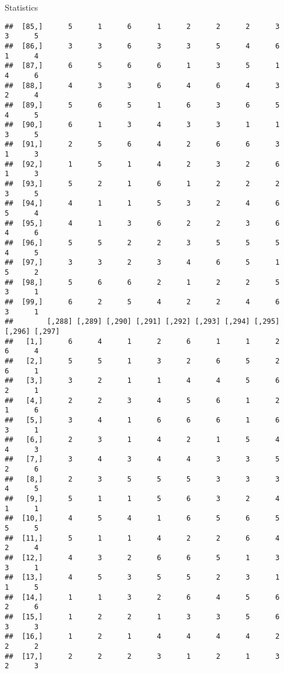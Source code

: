\documentclass[
  ignorenonframetext,
]{beamer}
\begin{document}
\begin{frame}[fragile]{Statistics}
\begin{verbatim}
##  [85,]      5      1      6      1      2      2      2      3      3      5
##  [86,]      3      3      6      3      3      5      4      6      1      4
##  [87,]      6      5      6      6      1      3      5      1      4      6
##  [88,]      4      3      3      6      4      6      4      3      2      4
##  [89,]      5      6      5      1      6      3      6      5      4      5
##  [90,]      6      1      3      4      3      3      1      1      3      5
##  [91,]      2      5      6      4      2      6      6      3      1      3
##  [92,]      1      5      1      4      2      3      2      6      1      3
##  [93,]      5      2      1      6      1      2      2      2      3      5
##  [94,]      4      1      1      5      3      2      4      6      5      4
##  [95,]      4      1      3      6      2      2      3      6      4      6
##  [96,]      5      5      2      2      3      5      5      5      4      5
##  [97,]      3      3      2      3      4      6      5      1      5      2
##  [98,]      5      6      6      2      1      2      2      5      3      1
##  [99,]      6      2      5      4      2      2      4      6      3      1
##        [,288] [,289] [,290] [,291] [,292] [,293] [,294] [,295] [,296] [,297]
##   [1,]      6      4      1      2      6      1      1      2      6      4
##   [2,]      5      5      1      3      2      6      5      2      6      1
##   [3,]      3      2      1      1      4      4      5      6      2      1
##   [4,]      2      2      3      4      5      6      1      2      1      6
##   [5,]      3      4      1      6      6      6      1      6      3      1
##   [6,]      2      3      1      4      2      1      5      4      4      3
##   [7,]      3      4      3      4      4      3      3      5      2      6
##   [8,]      2      3      5      5      5      3      3      3      4      5
##   [9,]      5      1      1      5      6      3      2      4      1      1
##  [10,]      4      5      4      1      6      5      6      5      5      5
##  [11,]      5      1      1      4      2      2      6      4      2      4
##  [12,]      4      3      2      6      6      5      1      3      3      1
##  [13,]      4      5      3      5      5      2      3      1      1      5
##  [14,]      1      1      3      2      6      4      5      6      2      6
##  [15,]      1      2      2      1      3      3      5      6      3      3
##  [16,]      1      2      1      4      4      4      4      2      2      2
##  [17,]      2      2      2      3      1      2      1      3      2      3

\end{verbatim}
\end{frame}
\end{document}
